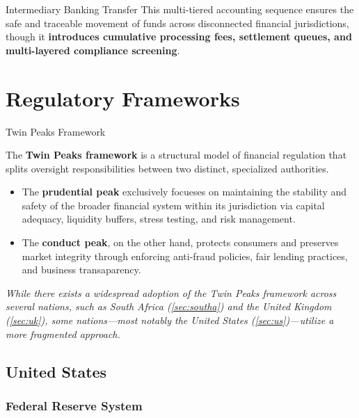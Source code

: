 \documentclass[10pt]{article}
\begin{document}
\begin{core}{Intermediary Banking Transfer}
      This multi-tiered accounting sequence ensures the safe and traceable movement of funds across disconnected financial jurisdictions, though it \textbf{introduces cumulative processing fees, settlement queues, and multi-layered compliance screening}.

    \end{core}

\section{Regulatory Frameworks}

  \begin{core}{Twin Peaks Framework}

    The \textbf{Twin Peaks framework} is a structural model of financial regulation that splits oversight responsibilities between two distinct, specialized authorities. 

    \begin{itemize}

      \item The \textbf{prudential peak} exclusively focueses on maintaining the stability and safety of the broader financial system within its jurisdiction via capital adequacy, liquidity buffers, stress testing, and risk management.

      \item The \textbf{conduct peak}, on the other hand, protects consumers and preserves market integrity through enforcing anti-fraud policies, fair lending practices, and business transaparency.

    \end{itemize}

    \textit{While there exists a widespread adoption of the Twin Peaks framework across several nations, such as South Africa (\autoref{sec:southa}) and the United Kingdom (\autoref{sec:uk}), some nations---most notably the United States (\autoref{sec:us})---utilize a more fragmented approach.}

  \end{core}

  \subsection{United States}
    \label{sec:us}

    \subsubsection{Federal Reserve System}
\end{document}
